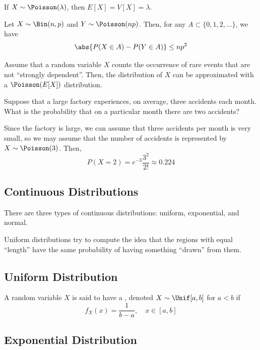 \documentclass[11pt]{article}
\begin{document}
\begin{rmk}
If $X \sim \Poisson(\lambda)$, then $E[X]=V[X]=\lambda$.
\end{rmk}

Let $X \sim \Bin(n,p)$ and $Y \sim \Poisson(np)$. Then, for any $A \subset \{0,1,2,\dots\}$, we have
\[
\abs{ P(X \in A)-P(Y \in A)} \leq np^2
\]

\begin{ex}
Assume that a random variable $X$ counts the occurrence of rare events that are not ``strongly dependent''. Then, the distribution of $X$ can be approximated with a $\Poisson(E[X])$ distribution.
\end{ex}

\begin{ex}
Suppose that a large factory experiences, on average, three accidents each month. What is the probability that on a particular month there are two accidents?
\end{ex}

\begin{solution}
Since the factory is large, we can assume that three accidents per month is very small, so we may assume that the number of accidents is represented by $X \sim \Poisson(3)$. Then,
\[
P(X=2)=e^{-3}\frac{3^2}{2!}\approx 0.224
\]
\end{solution}

\subsection*{Continuous Distributions}

There are three types of continuous distributions: uniform, exponential, and normal.

Uniform distributions try to compute the idea that the regions with equal ``length'' have the same probability of having something ``drawn'' from them.

\subsection{Uniform Distribution}

\begin{defn}
    A random variable $X$ is said to have a , denoted $X \sim \Unif[a,b]$ for $a<b$ if
    \[
    f_X(x)=\frac{1}{b-a},\quad x \in [a,b]
    \]
\end{defn}

\subsection{Exponential Distribution}
\end{document}
